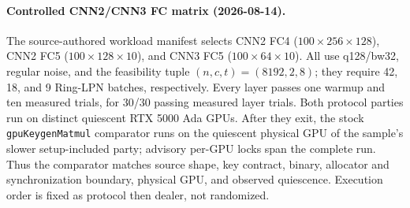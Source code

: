 \documentclass[11pt]{article}
\begin{document}
\paragraph{Controlled CNN2/CNN3 FC matrix (2026-08-14).}
The source-authored workload manifest selects CNN2 FC4
($100{\times}256{\times}128$), CNN2 FC5
($100{\times}128{\times}10$), and CNN3 FC5
($100{\times}64{\times}10$). All use q128/bw32, regular noise, and the
feasibility tuple $(n,c,t)=(8192,2,8)$; they require 42, 18, and 9 Ring-LPN
batches, respectively. Every layer passes one warmup and ten measured trials,
for 30/30 passing measured layer trials. Both protocol parties run on distinct
quiescent RTX 5000 Ada GPUs. After they exit, the stock
\texttt{gpuKeygenMatmul} comparator runs on the quiescent physical GPU of the
sample's slower setup-included party; advisory per-GPU locks span the complete
run. Thus the comparator matches source shape, key contract, binary, allocator
and synchronization boundary, physical GPU, and observed quiescence. Execution
order is fixed as protocol then dealer, not randomized.
\end{document}
